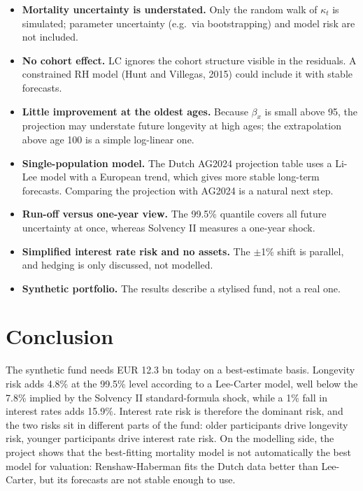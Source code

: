 \documentclass[11pt,a4paper]{article}
\begin{document}
\begin{itemize}
  \item \textbf{Mortality uncertainty is understated.} Only the random walk of $\kappa_t$ is
        simulated; parameter uncertainty (e.g.\ via bootstrapping) and model risk are not included.
  \item \textbf{No cohort effect.} LC ignores the cohort structure visible in the residuals. A
        constrained RH model (Hunt and Villegas, 2015) could include it with stable forecasts.
  \item \textbf{Little improvement at the oldest ages.} Because $\beta_x$ is small above 95,
        the projection may understate future longevity at high ages; the extrapolation above
        age 100 is a simple log-linear one.
  \item \textbf{Single-population model.} The Dutch AG2024 projection table uses a Li-Lee
        model with a European trend, which gives more stable long-term forecasts. Comparing the
        projection with AG2024 is a natural next step.
  \item \textbf{Run-off versus one-year view.} The 99.5\% quantile covers all future uncertainty
        at once, whereas Solvency II measures a one-year shock.
  \item \textbf{Simplified interest rate risk and no assets.} The $\pm$1\% shift is parallel, and
        hedging is only discussed, not modelled.
  \item \textbf{Synthetic portfolio.} The results describe a stylised fund, not a real one.
\end{itemize}

\section{Conclusion}

The synthetic fund needs EUR 12.3 bn today on a best-estimate basis. Longevity risk adds 4.8\%
at the 99.5\% level according to a Lee-Carter model, well below the 7.8\% implied by the
Solvency II standard-formula shock, while a 1\% fall in interest rates adds 15.9\%. Interest
rate risk is therefore the dominant risk, and the two risks sit in different parts of the fund:
older participants drive longevity risk, younger participants drive interest rate risk. On the
modelling side, the project shows that the best-fitting mortality model is not automatically
the best model for valuation: Renshaw-Haberman fits the Dutch data better than Lee-Carter, but
its forecasts are not stable enough to use.
\end{document}
